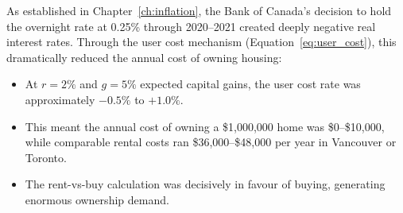 As established in Chapter~\ref{ch:inflation}, the Bank of Canada's decision
to hold the overnight rate at 0.25\% through 2020--2021 created deeply
negative real interest rates. Through the user cost mechanism
(Equation~\ref{eq:user_cost}), this dramatically reduced the annual cost
of owning housing:

\begin{itemize}
  \item At $r = 2\%$ and $g = 5\%$ expected capital gains, the user cost
        rate was approximately $-0.5\%$ to $+1.0\%$.
  \item This meant the annual cost of owning a \$1{,}000{,}000 home was
        \$0--\$10{,}000, while comparable rental costs ran \$36{,}000--\$48{,}000
        per year in Vancouver or Toronto.
  \item The rent-vs-buy calculation was decisively in favour of buying,
        generating enormous ownership demand.
\end{itemize}

